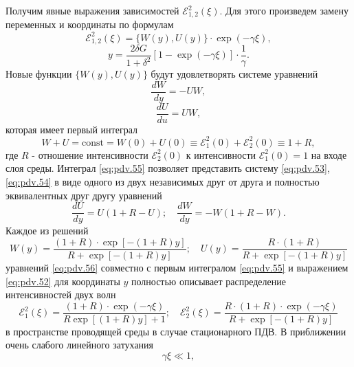 Получим явные выражения зависимостей $\mathcal{E}_{1,2}^2 (\xi)$. Для этого произведем замену переменных и координаты по формулам
\begin{equation}
	\label{eq:pdv.51}
	\mathcal{E}_{1,2}^{2}(\xi)=\{W(y), U(y)\} \cdot \exp (-\gamma \xi),
\end{equation}
\begin{equation}
	\label{eq:pdv.52}
	y=\frac{2 \delta G}{1+\delta^{2}}[1-\exp (-\gamma \xi)] \cdot \frac{1}{\gamma}.
\end{equation}
Новые функции $\{W(y), U(y)\}$ будут удовлетворять системе уравнений
\begin{equation}
	\label{eq:pdv.53}
	\frac{d W}{dy} = - UW,
\end{equation}
\begin{equation}
	\label{eq:pdv.54}
	\frac{d U} {du} = UW,
\end{equation}
которая имеет первый интеграл
\begin{equation}
	\label{eq:pdv.55}
	W+U=\text {const}=W(0)+U(0) \equiv \mathcal{E}_{1}^{2}(0)+\mathcal{E}_{2}^{2}(0) \equiv 1+R,
\end{equation}
где $R$ - отношение интенсивности $\mathcal{E}_{2}^{2}(0)$ к интенсивности $\mathcal{E}_{1}^{2}(0) = 1$ на входе слоя среды. Интеграл \eqref{eq:pdv.55} позволяет представить систему \eqref{eq:pdv.53}, \eqref{eq:pdv.54} в виде одного из двух независимых друг от друга и полностью эквивалентных друг другу уравнений 
\begin{equation}
	\label{eq:pdv.56}
	\frac{d U}{d y}=U(1+R-U) ; \quad \frac{d W}{d y}=-W(1+R-W).
\end{equation}
Каждое из решений
\begin{equation}
	\label{eq:pdv.57}
	W(y)=\frac{(1+R) \cdot \exp [-(1+R) y]}{R+\exp [-(1+R) y]} ; \quad U(y)=\frac{R \cdot(1+R)}{R+\exp [-(1+R) y]}
\end{equation}
уравнений \eqref{eq:pdv.56} совместно с первым интегралом \eqref{eq:pdv.55} и выражением \eqref{eq:pdv.52} для координаты $y$ полностью описывает распределение интенсивностей двух волн
\begin{equation}
	\label{eq:pdv.58}
	\mathcal{E}_{1}^{2}(\xi)=\frac{(1+R) \cdot \exp (-\gamma \xi)}{R \exp [(1+R) y]+1} ; \quad \mathcal{E}_{2}^{2}(\xi)=\frac{R \cdot(1+R) \cdot \exp (-\gamma \xi)}{R+\exp [-(1+R) y]}
\end{equation}
в пространстве проводящей среды в случае стационарного ПДВ. В приближении очень слабого линейного затухания
\begin{equation}
	\label{eq:pdv.59}
	\gamma \xi \ll 1,
\end{equation}
